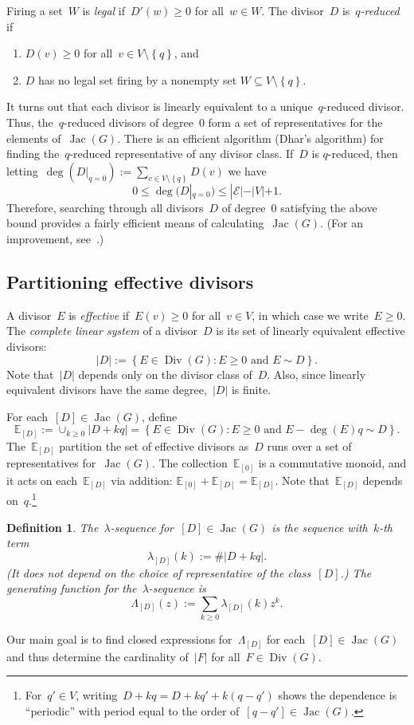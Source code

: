 \documentclass{amsart}
\newtheorem{Definition}[thm]{Definition}
\newenvironment{defn}
  {\begin{Definition}\rm}{\end{Definition}}
\DeclareMathOperator{\Jac}{Jac}
\DeclareMathOperator{\Div}{Div}
\newcommand{\E}{\mathbb{E}}
\begin{document}
Firing a set~$W$ is {\em legal} if~$D'(w)\geq0$ for all~$w\in W$.
The divisor~$D$ is~{\em $q$-reduced} if
\begin{enumerate}
  \item[(i)] $D(v)\geq 0$ for all~$v\in V\setminus\left\{ q \right\}$, and 
  \item[(ii)]  $D$ has no legal set firing by a nonempty set $W\subseteq V\setminus\left\{ q \right\}$.
\end{enumerate}
It turns out that each divisor is
linearly equivalent to a unique~$q$-reduced divisor. Thus, the~$q$-reduced
divisors of degree~$0$ form a set of representatives for the elements
of~$\Jac(G)$.  There is an efficient algorithm (Dhar's algorithm)
for finding the~$q$-reduced representative of any divisor class.  If~$D$ is
$q$-reduced, then
letting~$\deg(D|_{q=0}):=\sum_{v\in V\setminus\left\{ q \right\}}D(v)$ we have
\[
  0\leq\deg(D|_{q=0})\leq |\mathcal{E}|-|V|+1.
\]
Therefore, searching through all divisors~$D$ of degree~$0$ satisfying the above
bound provides a fairly efficient means of calculating~$\Jac(G)$.  (For an
improvement, see~\cite{Shokrieh}.)


\subsection{Partitioning effective divisors}
A divisor~$E$ is {\em effective} if~$E(v)\geq0$ for all~$v\in V$, in which case
we write~$E\geq0$.  The {\em complete linear system} of a divisor~$D$ is its set
of linearly equivalent effective divisors:
\[
  |D| := \left\{ E\in\Div(G): E\geq 0\text{ and } E\sim D \right\}.
\]
Note that~$|D|$ depends only on the divisor class of~$D$.  Also, since linearly
equivalent divisors have the same degree,~$|D|$ is finite.

For each~$[D]\in\Jac(G)$, define
\[
  \E_{[D]}:=\cup_{k\geq0}|D+kq|=\left\{ E\in\Div(G):E\geq0\text{ and }
  E-\deg(E)q\sim D \right\}.
\]
The~$\E_{[D]}$ partition the set of effective divisors as~$D$ runs over a set
of representatives for~$\Jac(G)$.  The collection~$\E_{[0]}$ is a commutative monoid, and
it acts on each~$\E_{[D]}$ via addition: $\E_{[0]}+\E_{[D]}=\E_{[D]}$.
Note that~$\E_{[D]}$ depends on~$q$.\footnote{For~$q'\in V$, writing~$D+kq =
  D+kq'+k(q-q')$ shows the dependence is ``periodic'' with period equal to the
  order of~$[q-q']\in\Jac(G)$.}

\begin{defn}
  The~$\lambda$-sequence for~$[D]\in\Jac(G)$ is the
  sequence with~$k$-th term
  \[
    \lambda_{[D]}(k):=\#|D+kq|.
  \]
  (It does not depend on the choice of representative of the
  class~$[D]$.)  The generating function for the~$\lambda$-sequence is
  \[
    \Lambda_{[D]}(z):=\sum_{k\geq0}\lambda_{[D]}(k)z^k.
  \]
\end{defn}
Our main goal is to find closed expressions for~$\Lambda_{[D]}$ for
each~$[D]\in\Jac(G)$ and thus determine the cardinality of~$|F|$ for
all~$F\in\Div(G)$.
\end{document}
